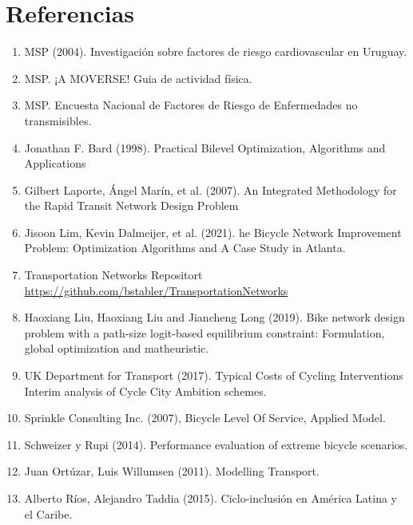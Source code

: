\documentclass{article}
\begin{document}
  \section{Referencias}

  \begin{enumerate}
      \item{\label{heartrisksuy} MSP (2004). Investigación sobre factores de riesgo cardiovascular en Uruguay.}
    \item{\label{mspphisicalactivityguid} MSP. ¡A MOVERSE! Guia de actividad física.}
    \item{\label{mspsurveyriskfactors} MSP. Encuesta Nacional de Factores de Riesgo de Enfermedades no transmisibles.}
    \item{\label{bardbook} Jonathan F. Bard (1998). Practical Bilevel Optimization, Algorithms and Applications}
    \item{\label{laporte2007} Gilbert Laporte, Ángel Marín, et al. (2007). An Integrated Methodology for the Rapid Transit Network Design Problem}
    \item{\label{lim2021}} Jisoon Lim, Kevin Dalmeijer, et al. (2021). he Bicycle Network Improvement Problem: Optimization Algorithms and A Case Study in Atlanta.
    \item{\label{transportationnetworkrepo} Transportation Networks Repositort \url{https://github.com/bstabler/TransportationNetworks}}
    \item{\label{liu2019} Haoxiang Liu, Haoxiang Liu and Jiancheng Long (2019). Bike network design problem with a path-size logit-based equilibrium constraint: Formulation, global optimization and matheuristic.}
    \item{\label{typicalcostsofcylcing} UK Department for Transport (2017). Typical Costs of Cycling Interventions Interim analysis of Cycle City Ambition schemes.}
    \item{\label{blos2007} Sprinkle Consulting Inc. (2007), Bicycle Level Of Service, Applied Model.}
    \item{\label{shwe2014} Schweizer y Rupi (2014). Performance evaluation of extreme bicycle scenarios.}
    \item{\label{ortuz2011} Juan Ortúzar, Luis Willumsen (2011). Modelling Transport.}
    \item{\label{rios2015} Alberto Ríos, Alejandro Taddia (2015). Ciclo-inclusión en América Latina y el Caribe.}
  \end{enumerate}
\end{document}
